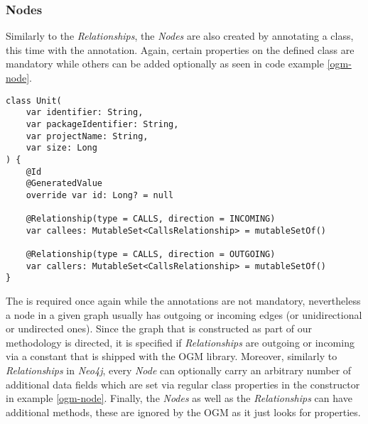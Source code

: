 \documentclass[12pt,a4paper]{report}
\begin{document}
\subsubsection{Nodes}
Similarly to the \textit{Relationships}, the \textit{Nodes} are also
created by annotating a class, this time with the 
annotation. Again, certain properties on the defined class are mandatory
while others can be added optionally as seen in code example \ref{ogm-node}.
\smaller
\begin{lstlisting}[caption=Node OGM class, label=ogm-node, breaklines=true]
class Unit(
    var identifier: String,
    var packageIdentifier: String,
    var projectName: String,
    var size: Long
) {
    @Id
    @GeneratedValue
    override var id: Long? = null

    @Relationship(type = CALLS, direction = INCOMING)
    var callees: MutableSet<CallsRelationship> = mutableSetOf()

    @Relationship(type = CALLS, direction = OUTGOING)
    var callers: MutableSet<CallsRelationship> = mutableSetOf()
}
\end{lstlisting}
\normalsize
The  is required once again while the 
annotations are not mandatory, nevertheless a node in a given graph usually
has outgoing or incoming edges (or unidirectional or undirected ones).
Since the graph that is constructed as part of our methodology is directed,
it is specified if \textit{Relationships} are outgoing or incoming via
a constant that is shipped with the OGM library.
Moreover, similarly to \textit{Relationships} in \textit{Neo4j}, every \textit{Node}
can optionally carry an arbitrary number of additional data fields which are set
via regular class properties in the constructor in example \ref{ogm-node}.
Finally, the \textit{Nodes} as well as the \textit{Relationships} can have additional
methods, these are ignored by the OGM as it just looks for properties.
\end{document}
